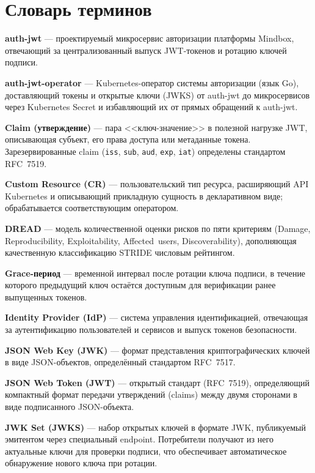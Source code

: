 \chapter*{Словарь терминов}

\textbf{auth-jwt} --- проектируемый микросервис авторизации платформы Mindbox,
отвечающий за централизованный выпуск JWT-токенов и ротацию ключей подписи.

\textbf{auth-jwt-operator} --- Kubernetes-оператор системы авторизации (язык Go),
доставляющий токены и открытые ключи (JWKS) от auth-jwt до микросервисов
через Kubernetes Secret и избавляющий их от прямых обращений к auth-jwt.

\textbf{Claim (утверждение)} --- пара <<ключ-значение>> в полезной нагрузке JWT,
описывающая субъект, его права доступа или метаданные токена.
Зарезервированные claim (\texttt{iss}, \texttt{sub}, \texttt{aud}, \texttt{exp}, \texttt{iat})
определены стандартом RFC~7519.

\textbf{Custom Resource (CR)} --- пользовательский тип ресурса,
расширяющий API Kubernetes и описывающий прикладную сущность в декларативном виде;
обрабатывается соответствующим оператором.

\textbf{DREAD} --- модель количественной оценки рисков по пяти критериям
(Damage, Reproducibility, Exploitability, Affected~users, Discoverability),
дополняющая качественную классификацию STRIDE числовым рейтингом.

\textbf{Grace-период} --- временной интервал после ротации ключа подписи,
в течение которого предыдущий ключ остаётся доступным для верификации
ранее выпущенных токенов.

\textbf{Identity Provider (IdP)} --- система управления идентификацией,
отвечающая за аутентификацию пользователей и сервисов
и выпуск токенов безопасности.

\textbf{JSON Web Key (JWK)} --- формат представления криптографических ключей
в виде JSON-объектов, определённый стандартом RFC~7517.

\textbf{JSON Web Token (JWT)} --- открытый стандарт (RFC~7519),
определяющий компактный формат передачи утверждений (claims)
между двумя сторонами в виде подписанного JSON-объекта.

\textbf{JWK Set (JWKS)} --- набор открытых ключей в формате JWK,
публикуемый эмитентом через специальный endpoint.
Потребители получают из него актуальные ключи для проверки подписи,
что обеспечивает автоматическое обнаружение нового ключа при ротации.

